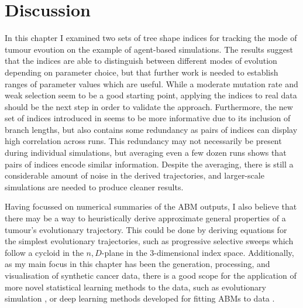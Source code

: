 \section{Discussion}
In this chapter I examined two sets of tree shape indices for tracking the mode
of tumour evoution on the example of agent-based simulations. The results
suggest that the indices are able to distinguish between different modes of
evolution depending on parameter choice, but that further work is needed to
establish ranges of parameter values which are useful. While a moderate
mutation rate and weak selection seem to be a good starting point, applying the
indices to real data should be the next step in order to validate the approach.
Furthermore, the new set of indices introduced in \cite{noble_new_2023} seems
to be more informative due to its inclusion of branch lengths, but also
contains some redundancy as pairs of indices can display high correlation
across runs. This redundancy may not necessarily be present during individual
simulations, but averaging even a few dozen runs shows that pairs of indices
encode similar information. Despite the averaging, there is still a
considerable amount of noise in the derived trajectories, and larger-scale
simulations are needed to produce cleaner results.\par
Having focussed on numerical summaries of the ABM outputs, I also believe that
there may be a way to heuristically derive approximate general properties of a
tumour's evolutionary trajectory. This could be done by deriving equations for
the simplest evolutionary trajectories, such as progressive selective sweeps
which follow a cycloid in the $n,D$-plane in the $3$-dimensional index space.
Additionally, as my main focus in this chapter has been the generation, processing,
and visualisation of synthetic cancer data, there is a good scope for the
application of more novel statistical learning methods to the data, such as
evolutionary simulation \cite{herald_autonomous_2022}, or deep learning methods
developed for fitting ABMs to data \cite{cess_fitting_2023}.

